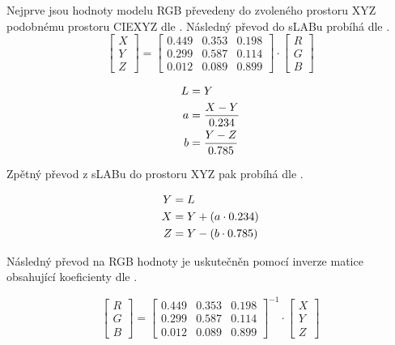 Nejprve jsou hodnoty modelu RGB převedeny do zvoleného prostoru XYZ podobnému prostoru CIEXYZ dle . Následný převod do sLABu probíhá dle .
\begin{equation}
  \label{eq:slabrgb2xyz}
  \begin{bmatrix}
      X \\ Y \\Z
  \end{bmatrix}
  = 
  \begin{bmatrix}
      0.449 & 0.353 & 0.198 \\
      0.299 & 0.587 & 0.114 \\
      0.012 & 0.089 & 0.899 
  \end{bmatrix}
  \cdot 
  \begin{bmatrix}
      R \\ G \\B
  \end{bmatrix}
\end{equation}

\begin{align}
  \label{eq:slabxyz2lab}
  L &= Y \notag \\
  a &= \frac{X-Y}{0.234} \\
  b &= \frac{Y-Z}{0.785} \notag
\end{align}

Zpětný převod z sLABu do prostoru XYZ pak probíhá dle .

\begin{align}
  \label{eq:slablab2xyz}
  Y &= L \notag \\
  X &= Y + (a \cdot 0.234) \\
  Z &= Y - (b \cdot 0.785) \notag
\end{align}

Následný převod na RGB hodnoty je uskutečněn pomocí inverze matice obsahující koeficienty dle .

\begin{equation}
  \label{eq:slabxyz2rgb}
  \begin{bmatrix}
      R \\ G \\B
  \end{bmatrix}
  = 
  \begin{bmatrix}
      0.449 & 0.353 & 0.198 \\
      0.299 & 0.587 & 0.114 \\
      0.012 & 0.089 & 0.899 
  \end{bmatrix}^{-1}
  \cdot 
  \begin{bmatrix}
      X \\ Y \\Z
  \end{bmatrix}
\end{equation}



